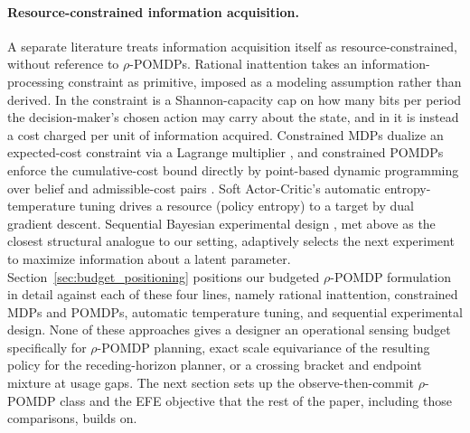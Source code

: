 \paragraph{Resource-constrained information acquisition.}
A separate literature treats information acquisition itself as resource-constrained, without reference to $\rho$-POMDPs. Rational inattention \citep{sims2003,matejka2015} takes an information-processing constraint as primitive, imposed as a modeling assumption rather than derived. In \citet{sims2003} the constraint is a Shannon-capacity cap on how many bits per period the decision-maker's chosen action may carry about the state, and in \citet{matejka2015} it is instead a cost charged per unit of information acquired. Constrained MDPs dualize an expected-cost constraint via a Lagrange multiplier \citep{altman1999}, and constrained POMDPs enforce the cumulative-cost bound directly by point-based dynamic programming over belief and admissible-cost pairs \citep{kim2011cpomdp}. Soft Actor-Critic's automatic entropy-temperature tuning \citep{haarnoja2018sac} drives a resource (policy entropy) to a target by dual gradient descent. Sequential Bayesian experimental design \citep{lindley1956,foster2021dad}, met above as the closest structural analogue to our setting, adaptively selects the next experiment to maximize information about a latent parameter. Section~\ref{sec:budget_positioning} positions our budgeted $\rho$-POMDP formulation in detail against each of these four lines, namely rational inattention, constrained MDPs and POMDPs, automatic temperature tuning, and sequential experimental design. None of these approaches gives a designer an operational sensing budget specifically for $\rho$-POMDP planning, exact scale equivariance of the resulting policy for the receding-horizon planner, or a crossing bracket and endpoint mixture at usage gaps. The next section sets up the observe-then-commit $\rho$-POMDP class and the EFE objective that the rest of the paper, including those comparisons, builds on.
